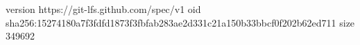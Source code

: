 version https://git-lfs.github.com/spec/v1
oid sha256:15274180a7f3fdfd1873f3fbfab283ae2d331c21a150b33bbcf0f202b62ed711
size 349692
